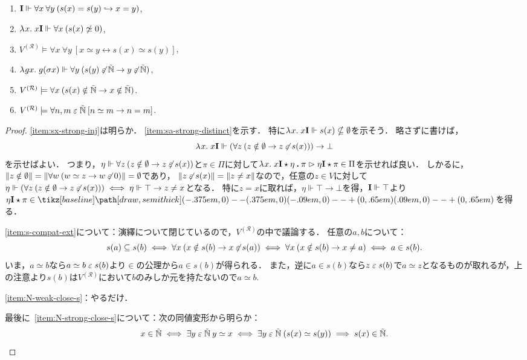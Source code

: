 \documentclass[realisability.tex]{subfiles}
\begin{document}
\begin{lemma}\label{lem:s-0-compat}
 \begin{enumerate}
  \item \label{item:sx-strong-inj}$\mathsf{\mathbf{I}} \Vdash \forall x \: \forall y \: (s(x) = s(y) \hookrightarrow x = y)$,
  \item \label{item:sa-strong-distinct}$\lambda^{\mathsf{}}x.\;x\mathsf{\mathbf{I}} \Vdash \forall x \: (s(x) \not\simeq 0)$,
  \item \label{item:s-compat-ext}$V^{(\mathcal{R})} \models \forall x\: \forall y \: [x \simeq y \leftrightarrow s(x) \simeq s(y)]$,
  \item \label{item:N-weak-close-s} $\lambda^{\mathsf{}}g x.\;g(\sigma x) \Vdash \forall y \: (s(y) \not\mathrel{\varepsilon} \mathord{\tilde{\mathbb{N}}} \to y \not\mathrel{\varepsilon} \mathord{\tilde{\mathbb{N}}}) $,
  \item \label{item:N-strong-close-s}$V^{(\mathcal{R})} \models \forall x \: (s(x) \notin \mathord{\tilde{\mathbb{N}}} \to x \notin \mathord{\tilde{\mathbb{N}}})$.
  \item \label{item:nat-ext-to-int}$V^{(\mathcal{R})} \models \forall n, m \mathrel{\varepsilon} \mathord{\tilde{\mathbb{N}}}\:[n \simeq m \to n = m]$.
 \end{enumerate}
\end{lemma}
\begin{proof}
 \ref{item:sx-strong-inj}は明らか．
 \ref{item:sa-strong-distinct}を示す．
 特に$\lambda^{\mathsf{}}x.\;x \mathsf{\mathbf{I}} \Vdash s(x) \nsubseteq \emptyset$を示そう．
 略さずに書けば，
 \[
  \lambda^{\mathsf{}}x.\;x \mathsf{\mathbf{I}} \Vdash (\forall z \: (z \notin \emptyset \to z \not\mathrel{\varepsilon} s(x))) \to \bot
 \]
 を示せばよい．
 つまり，$\eta \Vdash \forall z \: (z \notin \emptyset \to z \not\mathrel{\varepsilon} s(x))$と$\pi \in \Pi$に対して$\lambda^{\mathsf{}}x.\;x \mathsf{\mathbf{I}} \mathbin{\star} \eta \mathbin{\boldsymbol{.}} \pi \mathrel{\rhd} \eta \mathsf{\mathbf{I}} \mathbin{\star} \pi \in \Pi$を示せれば良い．
 しかるに，$\|z \notin \emptyset\| = \|\forall w\: (w \simeq z \to w \not\mathrel{\varepsilon} 0)\| = \emptyset$であり，
 $\|z \not\mathrel{\varepsilon} s(x)\| = \| z \neq x \|$なので，任意の$z \in V$に対して$\eta \Vdash (\forall z \: (z \notin \emptyset \to z \not\mathrel{\varepsilon} s(x))) \iff \eta \Vdash \top \to z \neq x$となる．
 特に$z = x$に取れば，$\eta \Vdash \top \to \bot$を得，$\mathsf{\mathbf{I}} \Vdash \top$より$\eta \I \cons \pi \in \pole$を得る．

 \ref{item:s-compat-ext}について：演繹について閉じているので，$V^{(\mathcal{R})}$の中で議論する．
 任意の$a, b$について：
 \[ s(a) \subseteq s(b)
 \iff \forall x\: (x \notin s(b) \to x \not\mathrel{\varepsilon} s(a))
 \iff \forall x\: (x \notin s(b) \to x \neq a)
 \iff a \in s(b).
 \]
 いま，$a \simeq b$なら$a \simeq b \mathrel{\varepsilon} s(b)$より${\in}$の公理から$a \in s(b)$が得られる．
 また，逆に$a \in s(b)$なら$z \mathrel{\varepsilon} s(b)$で$a \simeq z$となるものが取れるが，上の注意より$s(b)$は$V^{(\mathcal{R})}$において$b$のみしか元を持たないので$a \simeq b$.

 \ref{item:N-weak-close-s}：やるだけ．

 最後に~\ref{item:N-strong-close-s}について：次の同値変形から明らか：
 \[
       x \in \mathord{\tilde{\mathbb{N}}}
 \iff \exists y \mathrel{\varepsilon} \mathord{\tilde{\mathbb{N}}} \: y \simeq x
 \iff \exists y \mathrel{\varepsilon} \mathord{\tilde{\mathbb{N}}} \: (s(x) \simeq s(y))
 \implies s(x) \in \mathord{\tilde{\mathbb{N}}}.
 \]
\end{proof}
\end{document}
